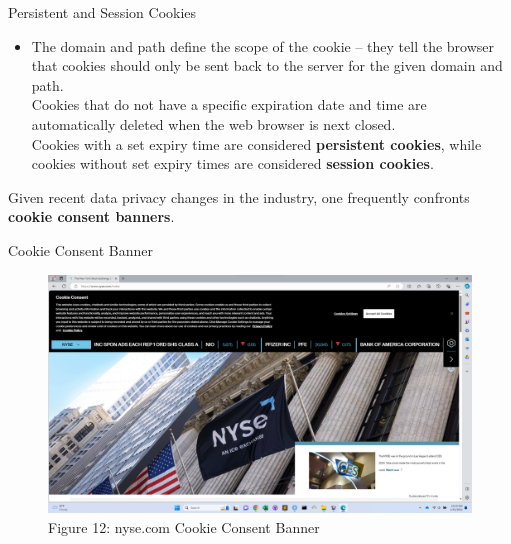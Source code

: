 \documentclass[pdf]{beamer}
\newcommand{\empr}[1]{{\color{franklinblue}\textbf{#1}}}
\theoremstyle{remark}
\theoremstyle{definition}
\begin{document}
\begin{frame}[t]{Persistent and Session Cookies}
\small
\begin{itemize}
  \item The domain and path define the scope of the cookie -- they tell the browser that cookies should only be sent back to the server for the given domain and path. \\
  \vspace{1.5ex}
  Cookies that do not have a specific expiration date and time are automatically deleted when the web browser is next closed. \\
  \vspace{1.5ex}
  Cookies with a set expiry time are considered \empr{persistent cookies}, while cookies without set expiry times are considered \empr{session cookies}.
\end{itemize}
\normalsize
Given recent data privacy changes in the industry, one frequently confronts \empr{cookie consent banners}. 
\end{frame}

\begin{frame}[t]{Cookie Consent Banner}
\begin{figure}[htbp]
    \centering
    \captionsetup{justification=centering}
    \includegraphics[clip, trim=0.0cm 0.0cm 0.0cm 0.0cm, width=1\textwidth]{Images/NYSE_Screenshot_2024_01_31_101021.png}  
    \caption{Figure {\color{franklinblue} 12}:  nyse.com Cookie Consent Banner}
    \label{fig:nyse}
\end{figure} 
\end{frame}
\end{document}
